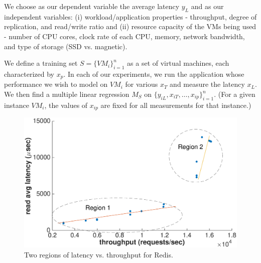 We choose as our dependent variable the average latency $y_{L}$ and as our independent variables: (i) workload/application properties - throughput, degree of replication, and read/write ratio and (ii) resource capacity of the VMs being used - number of CPU cores, clock rate of each CPU, memory, network bandwidth, and type of storage (SSD vs. magnetic). 


We define a training set $S = \{VM_i\}^n_{i=1}$ as a set of virtual machines, each characterized by $x_p$.  In each of our experiments, we run the application whose performance we wish to model on  $VM_i$ for various $x_{T}$ and measure the latency $x_{L}$.  We then find a multiple linear regression $M_S$ on $\{y_{iL},x_{iT},\ldots,x_{ip}\}^n_{i=1}$.  (For a given instance $VM_i$, the values of $x_{ip}$ are fixed for all measurements for that instance.) 


\begin{figure}
    \centering
    \includegraphics[scale = 0.35]{two_regions.eps}
    \caption{Two regions of latency vs. throughput for Redis. }
    \label{figure:combined}
\end{figure}

